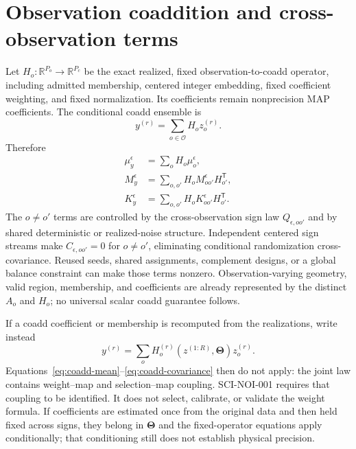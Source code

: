 \documentclass[11pt]{article}
\newcommand{\ThetaV}{\boldsymbol{\Theta}}
\begin{document}
\section{Observation coaddition and cross-observation terms}

Let $H_o:\mathbb R^{P_o}\rightarrow\mathbb R^{P_c}$ be the exact realized,
fixed observation-to-coadd operator, including admitted membership, centered
integer embedding, fixed coefficient weighting, and fixed normalization.
Its coefficients remain nonprecision MAP coefficients.  The conditional coadd
ensemble is
\begin{equation}
  y^{(r)}=\sum_{o\in\mathcal O}H_oz_o^{(r)}.
  \label{eq:fixed-coadd}
\end{equation}
Therefore
\begin{align}
  \mu_y^\epsilon
  &=\sum_oH_o\mu_o^\epsilon,
  \label{eq:coadd-mean}\\
  M_y^\epsilon
  &=\sum_{o,o'}H_oM_{oo'}^\epsilon H_{o'}^{\mathsf T},
  \label{eq:coadd-second-moment}\\
  K_y^\epsilon
  &=\sum_{o,o'}H_oK_{oo'}^\epsilon H_{o'}^{\mathsf T}.
  \label{eq:coadd-covariance}
\end{align}
The $o\ne o'$ terms are controlled by the cross-observation sign law
$Q_{\epsilon,oo'}$ and by shared deterministic or realized-noise structure.
Independent centered sign streams make
$C_{\epsilon,oo'}=0$ for $o\ne o'$, eliminating conditional randomization
cross-covariance.  Reused seeds, shared assignments, complement designs, or a
global balance constraint can make those terms nonzero.  Observation-varying
geometry, valid region, membership, and coefficients are already represented
by the distinct $A_o$ and $H_o$; no universal scalar coadd guarantee follows.

If a coadd coefficient or membership is recomputed from the realizations,
write instead
\begin{equation}
  y^{(r)}=\sum_o H_o^{(r)}\!\left(z^{(1:R)},\ThetaV\right)z_o^{(r)}.
  \label{eq:data-derived-coadd}
\end{equation}
Equations~\eqref{eq:coadd-mean}--\eqref{eq:coadd-covariance} then do not apply:
the joint law contains weight--map and selection--map coupling.  SCI-NOI-001
requires that coupling to be identified.  It does not select, calibrate, or
validate the weight formula.  If coefficients are estimated once from the
original data and then held fixed across signs, they belong in $\ThetaV$ and
the fixed-operator equations apply conditionally; that conditioning still
does not establish physical precision.
\end{document}
